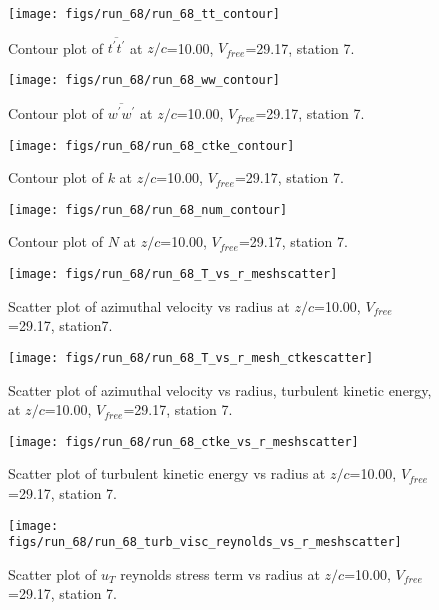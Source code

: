 \begin{figure}[H]
\centering
\texttt{[image: figs/run\_68/run\_68\_tt\_contour]}
\caption{Contour plot of $\overline{t^\prime t^\prime}$ at $z/c$=10.00, $V_{free}$=29.17, station 7.}
\end{figure}


\begin{figure}[H]
\centering
\texttt{[image: figs/run\_68/run\_68\_ww\_contour]}
\caption{Contour plot of $\overline{w^\prime w^\prime}$ at $z/c$=10.00, $V_{free}$=29.17, station 7.}
\end{figure}


\begin{figure}[H]
\centering
\texttt{[image: figs/run\_68/run\_68\_ctke\_contour]}
\caption{Contour plot of $k$ at $z/c$=10.00, $V_{free}$=29.17, station 7.}
\end{figure}


\begin{figure}[H]
\centering
\texttt{[image: figs/run\_68/run\_68\_num\_contour]}
\caption{Contour plot of $N$ at $z/c$=10.00, $V_{free}$=29.17, station 7.}
\end{figure}


\begin{figure}[H]
\centering
\texttt{[image: figs/run\_68/run\_68\_T\_vs\_r\_meshscatter]}
\caption{Scatter plot of azimuthal velocity vs radius at $z/c$=10.00, $V_{free}$=29.17, station7.}
\end{figure}


\begin{figure}[H]
\centering
\texttt{[image: figs/run\_68/run\_68\_T\_vs\_r\_mesh\_ctkescatter]}
\caption{Scatter plot of azimuthal velocity vs radius, turbulent kinetic energy, at $z/c$=10.00, $V_{free}$=29.17, station 7.}
\end{figure}


\begin{figure}[H]
\centering
\texttt{[image: figs/run\_68/run\_68\_ctke\_vs\_r\_meshscatter]}
\caption{Scatter plot of turbulent kinetic energy vs radius at $z/c$=10.00, $V_{free}$=29.17, station 7.}
\end{figure}


\begin{figure}[H]
\centering
\texttt{[image: figs/run\_68/run\_68\_turb\_visc\_reynolds\_vs\_r\_meshscatter]}
\caption{Scatter plot of $
u_T$ reynolds stress term vs radius at $z/c$=10.00, $V_{free}$=29.17, station 7.}
\end{figure}


